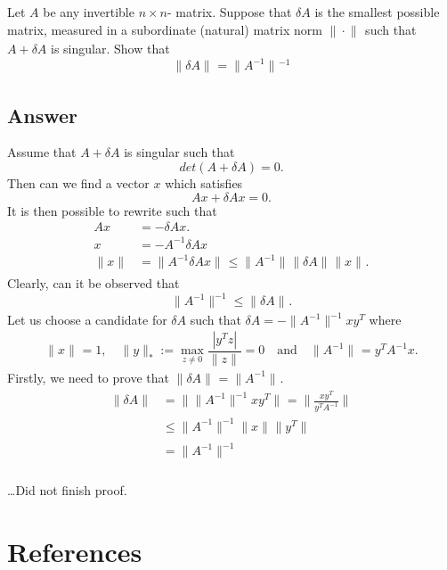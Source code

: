 \documentclass{article}
\theoremstyle{remark}
\begin{document}
 Let $A$ be any invertible $n \times n $- matrix. Suppose that $\delta A$ is the smallest possible matrix, measured in a subordinate (natural) matrix norm $\|\cdot \|_{}^{}$ such that $A + \delta A$ is singular. Show that \[
 \|\delta A\|_{}^{} = \|A^{-1}\|_{}^{} ^{-1}
 \] 
 
 \subsection{Answer}%
 \label{sub:answer}
 Assume that $A + \delta A $ is singular such that\[
 det\left( A + \delta A \right) = 0.
 \] 
 Then can we find a vector $x$ which satisfies \[
 Ax +  \delta A x = 0.  \] 
 It is then possible to rewrite such that
 \[
   \begin{split}
 Ax  & = - \delta A x .\\
 x &= -  A^{-1} \delta A x \\
 \|x\|_{}^{}  &  = \|A^{-1} \delta A x\|_{}^{}  \le  \|A^{-1}\|_{}^{}  \|\delta A\|_{}^{} \|x\|_{}^{}.
   \end{split} 
 \] 
 Clearly, can it be observed that\[
   \|A^{-1}\|_{}^{-1} \le \|\delta A\|_{}^{}.
 \] 
 Let us choose a candidate for $\delta  A$ such that $\delta A = - \|A^{-1}\|_{}^{-1} x y^{T}$ where \[
   \|x\|_{}^{} = 1, \quad  \|y\|_{*}^{ }  := \max_{z \neq 0}  \frac{\left\lvert y^{T} z \right\rvert }{ \|z\|_{}^{}}  = 0 \quad  \text{and} \quad \|A^{-1}\|_{}^{} = y^{T} A^{-1} x  .
 \] 
 Firstly, we need to prove that $\|\delta A\|_{}^{} = \|A^{-1}\|_{}^{}$. \[
   \begin{split}
 \|\delta A\|_{}^{}  & = \| \|A^{-1}\|_{}^{-1} xy^{T} \|_{}^{}  = \| \frac{xy^{T}}{ y^{T} A^{-1}} \|_{}^{}\\
 & \le \|A^{-1}\|_{}^{-1} \|x\|_{}^{} \|y^{T}\|_{}^{}  \\
 &= \|A^{-1}\|_{}^{-1} \\
   \end{split} 
 \] 

 \ldots Did not finish proof.

 
 
 
 

\newpage

\section{References}%
\label{sec:references}


\end{document}
